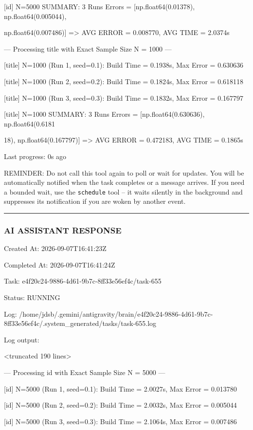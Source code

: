 \documentclass[11pt,a4paper]{article}
\begin{document}
[id] N=5000 SUMMARY: 3 Runs Errors = [np.float64(0.01378), np.float64(0.005044),

np.float64(0.007486)] => AVG ERROR = 0.008770, AVG TIME = 2.0374s


--- Processing title with Exact Sample Size N = 1000 ---

[title] N=1000 (Run 1, seed=0.1): Build Time = 0.1938s, Max Error = 0.630636

[title] N=1000 (Run 2, seed=0.2): Build Time = 0.1824s, Max Error = 0.618118

[title] N=1000 (Run 3, seed=0.3): Build Time = 0.1832s, Max Error = 0.167797

[title] N=1000 SUMMARY: 3 Runs Errors = [np.float64(0.630636), np.float64(0.6181

18), np.float64(0.167797)] => AVG ERROR = 0.472183, AVG TIME = 0.1865s


Last progress: 0s ago



REMINDER: Do not call this tool again to poll or wait for updates. You will be automatically notified when the task completes or a message arrives. If you need a bounded wait, use the \texttt{schedule} tool -- it waits silently in the background and suppresses its notification if you are woken by another event.


\hrule

\subsubsection{AI ASSISTANT RESPONSE}

Created At: 2026-09-07T16:41:23Z

Completed At: 2026-09-07T16:41:24Z

Task: e4f20c24-9886-4d61-9b7c-8ff33e56ef4c/task-655

Status: RUNNING

Log: /home/jdsb/.gemini/antigravity/brain/e4f20c24-9886-4d61-9b7c-8ff33e56ef4c/.system\_generated/tasks/task-655.log

Log output:

<truncated 190 lines>


--- Processing id with Exact Sample Size N = 5000 ---

[id] N=5000 (Run 1, seed=0.1): Build Time = 2.0027s, Max Error = 0.013780

[id] N=5000 (Run 2, seed=0.2): Build Time = 2.0032s, Max Error = 0.005044

[id] N=5000 (Run 3, seed=0.3): Build Time = 2.1064s, Max Error = 0.007486
\end{document}
